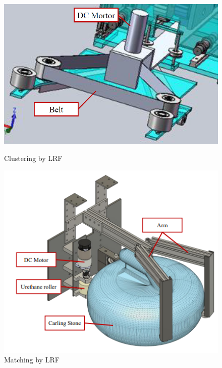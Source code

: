 \documentclass{classes/sice-si}
\begin{document}
\begin{figure}[H]
    \centering
    \vspace{4pt} %
    \begin{minipage}{0.45\linewidth}
        \centering
        \includegraphics[width=\linewidth]{figures/1.png}
        \caption{Clustering by LRF}
        \label{fig:1}
    \end{minipage}
    \hfill
    \begin{minipage}{0.45\linewidth}
        \centering
        \includegraphics[width=\linewidth]{figures/2.png}
        \caption{Matching by LRF}
        \label{fig:2}
    \end{minipage}
    \hfill
    \begin{minipage}{0.45\linewidth}

\end{minipage}
\end{figure}
\end{document}
